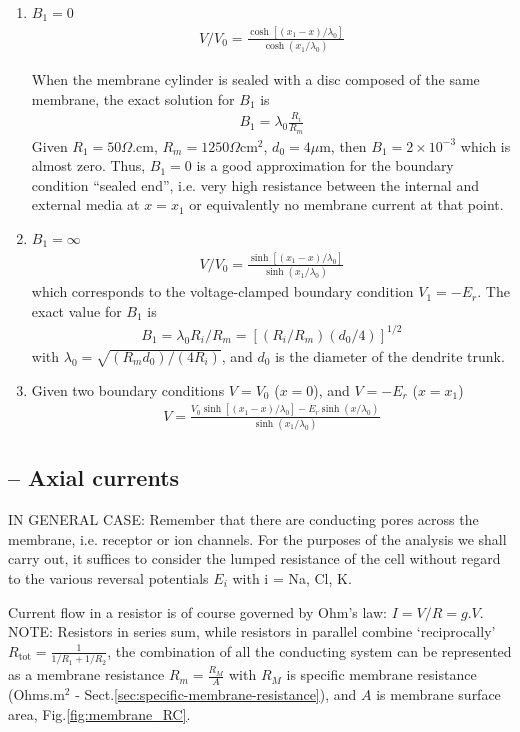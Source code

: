\begin{enumerate}
\item $B_1=0$
  \begin{eqnarray}
    \label{eq:460}
    V/V_0 = \frac{\cosh[(x_1-x)/\lambda_0]}{\cosh(x_1/\lambda_0)}
  \end{eqnarray}

When the membrane cylinder is sealed with a disc composed of the same
membrane, the exact solution for $B_1$ is
\begin{eqnarray*}
  B_1=\lambda_0\frac{R_i}{R_m}
\end{eqnarray*}
Given $R_1=50\Omega$.cm, $R_m=1250\Omega$cm$^2$, $d_0=4\mu$m, then
$B_1=2\times 10^{-3}$ which is almost zero. Thus, $B_1=0$ is a good
approximation for the boundary condition ``sealed end'', i.e. very
high resistance between the internal and external media at $x=x_1$ or
equivalently no membrane current at that point.

\item $B_1=\infty$
  \begin{eqnarray}
    \label{eq:461}
    V/V_0 = \frac{\sinh[(x_1-x)/\lambda_0]}{\sinh(x_1/\lambda_0)}
  \end{eqnarray}
  which corresponds to the voltage-clamped boundary condition
  $V_1=-E_r$. The exact value for $B_1$ is
  \begin{eqnarray*}
    B_1 = \lambda_0R_i/R_m =\left[ (R_i/R_m)(d_0/4)\right]^{1/2}
  \end{eqnarray*}
  with $\lambda_0=\sqrt{(R_md_0)/(4R_i)}$, and $d_0$ is the diameter
  of the dendrite trunk.

\item Given two boundary conditions $V=V_0$ ($x=0$), and $V=-E_r$
  ($x=x_1$)
  \begin{eqnarray}
    \label{eq:462}
    V = \frac{V_0\sinh \left[ (x_1-x)/\lambda_0\right] - E_r\sinh (x/\lambda_0)}{\sinh (x_1/\lambda_0)}
  \end{eqnarray}
\end{enumerate}

\subsection{-- Axial currents}
\label{sec:axial-current}


\begin{mdframed}

IN GENERAL CASE: Remember that there are conducting pores across the membrane,
i.e. receptor or ion channels. For the purposes of the analysis we shall carry
out, it suffices to consider the lumped resistance of the cell without regard to
the various reversal potentials $E_i$ with i = Na, Cl, K.

Current flow in a resistor is of course governed by Ohm's law: $I=V/R=g.V$.
NOTE: Resistors in series sum, while resistors in parallel combine
`reciprocally' $R_\text{tot}=\frac{1}{1/R_1 + 1/R_2}$, the combination of all
the conducting system can be represented as a membrane resistance $R_m =
\frac{R_M}{A}$ with $R_M$ is specific membrane resistance (Ohms.m$^2$ -
Sect.\ref{sec:specific-membrane-resistance}), and $A$ is membrane surface area,
Fig.\ref{fig:membrane_RC}.
\end{mdframed}

